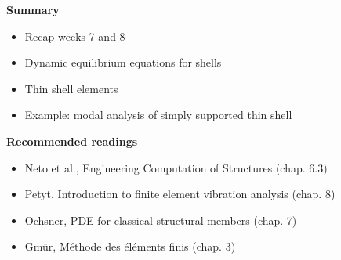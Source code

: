 \documentclass[aspectratio=169]{beamer}
\begin{document}
{  \begin{frame}
    \textbf{\large Summary}
    \begin{itemize}
      \item Recap weeks 7 and 8
      \item Dynamic equilibrium equations for shells
      \item Thin shell elements
      \item Example: modal analysis of simply supported thin shell
    \end{itemize}
    \vspace{.5cm}

    \textbf{\large Recommended readings}
    \begin{itemize}
      \item[(N)] Neto et al., Engineering Computation of Structures (chap. 6.3)
      \item[(P)] Petyt, Introduction to finite element vibration analysis (chap. 8)
      \item[(O)] Ochsner, PDE for classical structural members (chap. 7)
      \item[(G)] Gmür, Méthode des éléments finis (chap. 3)
    \end{itemize}
  \end{frame}
}
\end{document}
